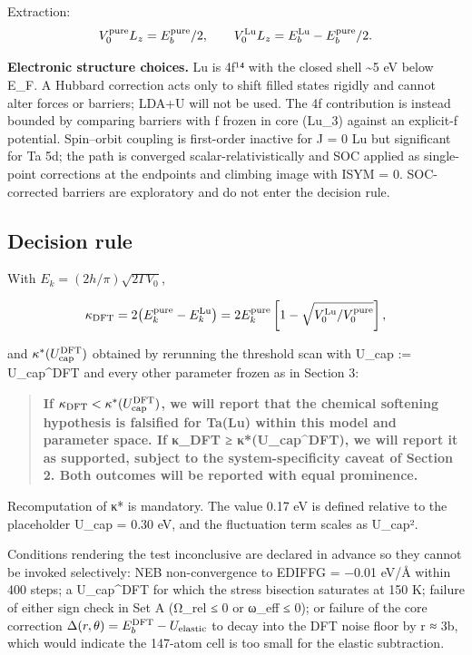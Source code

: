 \documentclass[11pt,a4paper]{article}
\begin{document}
Extraction: \[V_0^{\rm pure}L_z = E_b^{\rm pure}/2,\qquad V_0^{\rm Lu}L_z = E_b^{\rm Lu} - E_b^{\rm pure}/2.\]

\textbf{Electronic structure choices.} Lu is 4f¹⁴ with the closed shell \textasciitilde5 eV below E\_F. A Hubbard correction acts only to shift filled states rigidly and cannot alter forces or barriers; LDA+U will not be used. The 4f contribution is instead bounded by comparing barriers with f frozen in core (Lu\_3) against an explicit-f potential. Spin--orbit coupling is first-order inactive for J = 0 Lu but significant for Ta 5d; the path is converged scalar-relativistically and SOC applied as single-point corrections at the endpoints and climbing image with ISYM = 0. SOC-corrected barriers are exploratory and do not enter the decision rule.

\hypertarget{decision-rule}{%
\subsection{Decision rule}\label{sec:decision-rule}}

With \(E_k = (2h/\pi)\sqrt{2\Gamma V_0}\),

\[\kappa_{\rm DFT} = 2\bigl(E_k^{\rm pure} - E_k^{\rm Lu}\bigr) = 2E_k^{\rm pure}\left[1 - \sqrt{V_0^{\rm Lu}/V_0^{\rm pure}}\right],\]

and \(\kappa^*(U_{\rm cap}^{\rm DFT})\) obtained by rerunning the threshold scan with U\_cap := U\_cap\^{}DFT and every other parameter frozen as in Section 3:

\begin{quote}
\textbf{If \(\kappa_{\rm DFT} < \kappa^*(U_{\rm cap}^{\rm DFT})\), we will report that the chemical softening hypothesis is falsified for Ta(Lu) within this model and parameter space. If κ\_DFT ≥ κ*(U\_cap\^{}DFT), we will report it as supported, subject to the system-specificity caveat of Section 2. Both outcomes will be reported with equal prominence.}
\end{quote}

Recomputation of κ* is mandatory. The value 0.17 eV is defined relative to the placeholder U\_cap = 0.30 eV, and the fluctuation term scales as U\_cap².

Conditions rendering the test inconclusive are declared in advance so they cannot be invoked selectively: NEB non-convergence to EDIFFG = −0.01 eV/Å within 400 steps; a U\_cap\^{}DFT for which the stress bisection saturates at 150 K; failure of either sign check in Set A (Ω\_rel ≤ 0 or ω\_eff ≤ 0); or failure of the core correction \(\Delta(r,\theta) = E_b^{\rm DFT} - U_{\rm elastic}\) to decay into the DFT noise floor by r ≈ 3b, which would indicate the 147-atom cell is too small for the elastic subtraction.
\end{document}
